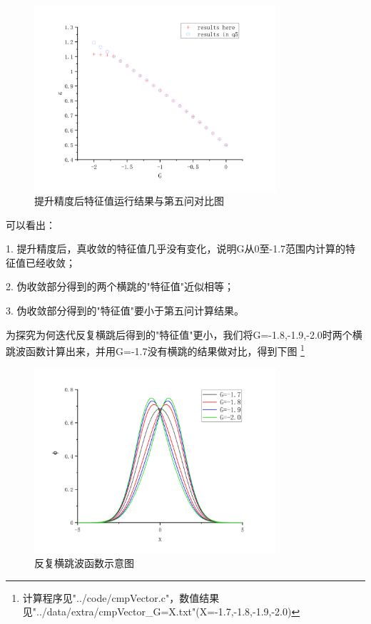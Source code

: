 \documentclass[10pt, a4paper]{article}
\begin{document}
    \begin{figure}[H]
      \centering
      \includegraphics[width=0.8\textwidth]{提升精度后特征值运行结果与第五问对比图.jpg}
      \caption{提升精度后特征值运行结果与第五问对比图}\label{fig:提升精度后特征值运行结果与第五问对比图}
    \end{figure}

    可以看出：

    1. 提升精度后，真收敛的特征值几乎没有变化，说明G从0至-1.7范围内计算的特征值已经收敛；

    2. 伪收敛部分得到的两个横跳的"特征值"近似相等；

    3. 伪收敛部分得到的"特征值"要小于第五问计算结果。

    为探究为何迭代反复横跳后得到的"特征值"更小，我们将G=-1.8,-1.9,-2.0时两个横跳波函数计算出来，并用G=-1.7没有横跳的结果做对比，得到下图
    \footnote{计算程序见"../code/cmpVector.c"，数值结果见"../data/extra/cmpVector_G=X.txt"(X=-1.7,-1.8,-1.9,-2.0)}

    \begin{figure}[H]
      \centering
      \includegraphics[width=0.8\textwidth]{反复横跳波函数示意图.jpg}
      \caption{反复横跳波函数示意图}\label{fig:反复横跳波函数示意图}
    \end{figure}
\end{document}
